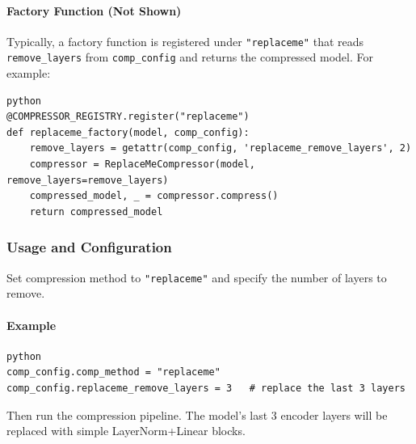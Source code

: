 \paragraph{Factory Function (Not Shown)}

Typically, a factory function is registered under \texttt{"replaceme"} that reads \texttt{remove\_layers} from \texttt{comp\_config} and returns the compressed model. For example:

\vspace{0.5em}
\begin{mdframed}[backgroundcolor=codebg, linecolor=codeframe, linewidth=1pt, roundcorner=4pt, innerleftmargin=2pt, innerrightmargin=5pt, innertopmargin=5pt, innerbottommargin=5pt]
\begin{lstlisting}
python
@COMPRESSOR_REGISTRY.register("replaceme")
def replaceme_factory(model, comp_config):
    remove_layers = getattr(comp_config, 'replaceme_remove_layers', 2)
    compressor = ReplaceMeCompressor(model, remove_layers=remove_layers)
    compressed_model, _ = compressor.compress()
    return compressed_model
\end{lstlisting}
\end{mdframed}
\vspace{0.5em}


\subsubsection*{Usage and Configuration}

Set compression method to \texttt{"replaceme"} and specify the number of layers to remove.

\paragraph{Example}

\vspace{0.5em}
\begin{mdframed}[backgroundcolor=codebg, linecolor=codeframe, linewidth=1pt, roundcorner=4pt, innerleftmargin=2pt, innerrightmargin=5pt, innertopmargin=5pt, innerbottommargin=5pt]
\begin{lstlisting}
python
comp_config.comp_method = "replaceme"
comp_config.replaceme_remove_layers = 3   # replace the last 3 layers
\end{lstlisting}
\end{mdframed}
\vspace{0.5em}

Then run the compression pipeline. The model's last 3 encoder layers will be replaced with simple LayerNorm+Linear blocks.

